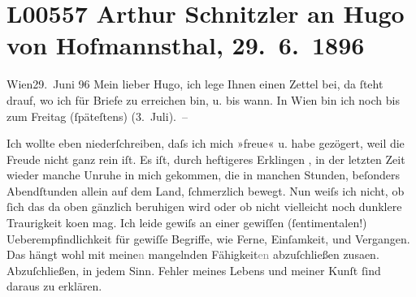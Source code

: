 

\section[Arthur Schnitzler an Hugo von Hofmannsthal, 29. 6. 1896]{L00557 Arthur Schnitzler an Hugo von Hofmannsthal, 29. 6. 1896}
\nopagebreak{}
\rehead{ }\normalsize\beginnumbering{}
\toendnotes[C]{\smallbreak\pagebreak[2]}
\toendnotes[C]{\smallbreak}
\pstart
           \raggedleft{}{\pb}Wien29. Juni 96\pend
           \vspace{0.5em}
\pstart
           Mein lieber Hugo, ich lege Ihnen einen Zettel bei, da ſteht drauf,
               wo ich für Briefe zu erreichen bin, u. bis wann. In Wien bin ich noch bis zum Freitag (ſpäteſtens)
                  (3. Juli). –\pend
           
\pstart
           Ich wollte eben niederſchreiben, daſs ich mich »freue« u. habe gezögert, weil die
               Freude nicht ganz rein iſt. Es iſt, durch heftigeres Erklin{\pb}gen \label{K_L00557-1v}\label{K_L00557-1}, in der letzten Zeit
               wieder manche Unruhe in mich gekommen, die in manchen Stunden, beſonders Abendſtunden
               allein auf dem Land, ſchmerzlich bewegt. Nun weiſs ich nicht, ob ſich das da oben
               gänzlich beruhigen wird oder ob nicht vielleicht noch dunklere Traurigkeit ko{\geminationm}en mag. Ich leide gewiſs an {\pb}einer gewiſſen \introOben{}(\introOben{}ſentimentalen\introOben{}!)\introOben{}
               Ueberempfindlichkeit für gewiſſe Begriffe, wie Ferne, Einſamkeit, und Vergangen. Das
               hängt wohl mit meine\textcolor{gray}{n} mangelnden Fähigkeit\textcolor{gray}{en}{ }\introOben{}abzuſchließen\introOben{} zusa{\geminationm}en.
               Abzuſchließen, in jedem Sinn. Fehler meines Lebens und meiner Kunſt ſind daraus zu
               erklären.\pend
           
